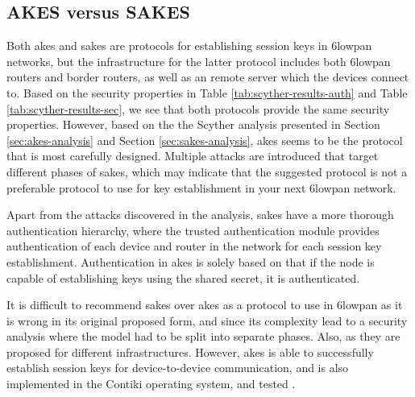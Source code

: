 \subsection{AKES versus SAKES}

Both \gls{akes} and \gls{sakes} are protocols for establishing session keys in \gls{6lowpan} networks, but the infrastructure for the latter protocol includes both \gls{6lowpan} routers and border routers, as well as an remote server which the devices connect to. Based on the security properties in Table \ref{tab:scyther-results-auth} and Table \ref{tab:scyther-results-sec}, we see that both protocols provide the same security properties. However, based on the the Scyther analysis presented in Section \ref{sec:akes-analysis} and Section \ref{sec:sakes-analysis}, \gls{akes} seems to be the protocol that is most carefully designed. Multiple attacks are introduced that target different phases of \gls{sakes}, which may indicate that the suggested protocol is not a preferable protocol to use for key establishment in your next \gls{6lowpan} network.

Apart from the attacks discovered in the analysis, \gls{sakes} have a more thorough authentication hierarchy, where the trusted authentication module provides authentication of each device and router in the network for each session key establishment. Authentication in \gls{akes} is solely based on that if the node is capable of establishing keys using the shared secret, it is authenticated.

It is difficult to recommend \gls{sakes} over \gls{akes} as a protocol to use in \gls{6lowpan} as it is wrong in its original proposed form, and since its complexity lead to a security analysis where the model had to be split into separate phases. Also, as they are proposed for different infrastructures. However, \gls{akes} is able to successfully establish session keys for device-to-device communication, and is also implemented in the Contiki operating system, and tested \cite{krentz2015handling}.



% 




